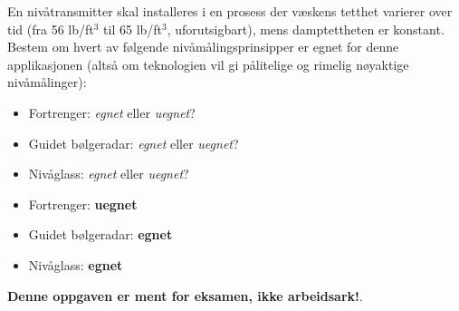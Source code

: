 

En nivåtransmitter skal installeres i en prosess der væskens tetthet varierer over tid (fra 56 lb/ft$^{3}$ til 65 lb/ft$^{3}$, uforutsigbart), mens damptettheten er konstant. Bestem om hvert av følgende nivåmålingsprinsipper er egnet for denne applikasjonen (altså om teknologien vil gi pålitelige og rimelig nøyaktige nivåmålinger):

\begin{itemize}
\item{} Fortrenger: {\it egnet} eller {\it uegnet}?
\vskip 10pt
\item{} Guidet bølgeradar: {\it egnet} eller {\it uegnet}?
\vskip 10pt
\item{} Nivåglass: {\it egnet} eller {\it uegnet}?
\end{itemize}







\begin{itemize}
\item{} Fortrenger: {\bf uegnet}
\vskip 10pt
\item{} Guidet bølgeradar: {\bf egnet}
\vskip 10pt
\item{} Nivåglass: {\bf egnet}
\end{itemize}







{\bf Denne oppgaven er ment for eksamen, ikke arbeidsark!}.


